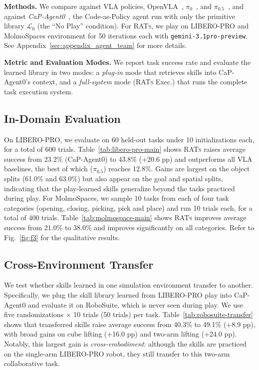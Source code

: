 \documentclass{llmxive}
\begin{document}
\textbf{Methods.} We compare against VLA policies, OpenVLA~\cite{openvla},
$\pi_0$~\citep{black2025pi0}, and
$\pi_{0.5}$~\citep{physicalintelligence2025pi05}, and against
\emph{CaP-Agent0}~\cite{fu2026capx}, the Code-as-Policy agent run with only the primitive library $\mathcal{L}_0$ (the ``No Play'' condition). For \textsc{RATs}, we play on LIBERO-PRO and MolmoSpaces environment for 50 iterations each with \texttt{gemini-3.1pro-preview}. See Appendix~\ref{sec:appendix_agent_team} for more details.

\textbf{Metric and Evaluation Modes.} We report task success rate and evaluate the
learned library in two modes: a \emph{plug-in} mode that retrieves skills into CaP-Agent0's context, and a \emph{full-system} mode (\textsc{RATs} Exec.) that runs the complete task execution system.

\subsection{In-Domain Evaluation}
\label{subsec:in-domain-molmo}

On LIBERO-PRO, we evaluate on 60 held-out tasks under 10 initializations each, for a total of 600 trials.
Table~\ref{tab:libero-pro-main} shows \textsc{RATs} raises average success from 23.2\% (CaP-Agent0) to 43.8\% (+20.6 pp) and outperforms all VLA baselines, the best of which ($\pi_{0.5}$) reaches 12.8\%. Gains are largest on the object splits
(61.0\% and 63.0\%) but also appear on the goal and spatial splits, indicating
that the play-learned skills generalize beyond the tasks practiced during play.
For MolmoSpaces, we sample 10 tasks from each of four task categories (opening, closing, picking, pick and place) and run 10 trials each, for a total of 400 trials.
Table~\ref{tab:molmospace-main} shows \textsc{RATs} improves average success from 21.0\% to 38.0\% and improves significantly on all categories. Refer to Fig.~\ref{fig:f3} for the qualitative results.


\subsection{Cross-Environment Transfer}
\label{subsec:cross-env-transfer}
We test whether skills learned in one simulation environment transfer to another. Specifically, we plug the skill library learned from LIBERO-PRO play into CaP-Agent0 and evaluate it on RoboSuite, which is never seen during play.
We use five randomizations $\times$ 10 trials
(50 trials) per task.
Table~\ref{tab:robosuite-transfer} shows that transferred skills raise average success from 40.3\% to 49.1\% (+8.9 pp), with broad gains on cube lifting (+16.0 pp) and two-arm lifting (+24.0 pp). Notably, this largest gain is \textit{cross-embodiment}: although the skills are practiced on the single-arm LIBERO-PRO robot, they still transfer to this two-arm collaborative task.
\end{document}
